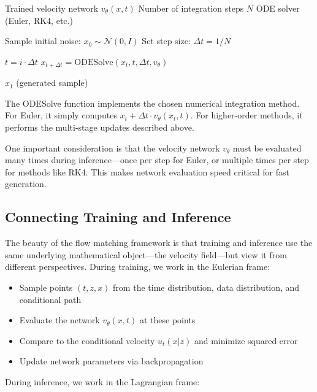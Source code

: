\documentclass{book}
\begin{document}
\begin{algorithm}
\caption{Flow Model Sampling}
\label{alg:flow_sampling}
\begin{algorithmic}[1]
\Require Trained velocity network $v_\theta(x, t)$
\Require Number of integration steps $N$
\Require ODE solver (Euler, RK4, etc.)

\State Sample initial noise: $x_0 \sim \mathcal{N}(0, I)$
\State Set step size: $\Delta t = 1 / N$

    \State $t = i \cdot \Delta t$
    \State $x_{t + \Delta t} = \text{ODESolve}(x_t, t, \Delta t, v_\theta)$
\EndFor

\State \Return $x_1$ (generated sample)
\end{algorithmic}
\end{algorithm}

The ODESolve function implements the chosen numerical integration method. For Euler, it simply computes $x_t + \Delta t \cdot v_\theta(x_t, t)$. For higher-order methods, it performs the multi-stage updates described above.

One important consideration is that the velocity network $v_\theta$ must be evaluated many times during inference—once per step for Euler, or multiple times per step for methods like RK4. This makes network evaluation speed critical for fast generation.

\subsection{Connecting Training and Inference}

The beauty of the flow matching framework is that training and inference use the same underlying mathematical object—the velocity field—but view it from different perspectives. During training, we work in the Eulerian frame:

\begin{itemize}
\item Sample points $(t, z, x)$ from the time distribution, data distribution, and conditional path
\item Evaluate the network $v_\theta(x, t)$ at these points
\item Compare to the conditional velocity $u_t(x|z)$ and minimize squared error
\item Update network parameters via backpropagation
\end{itemize}

During inference, we work in the Lagrangian frame:
\end{document}
